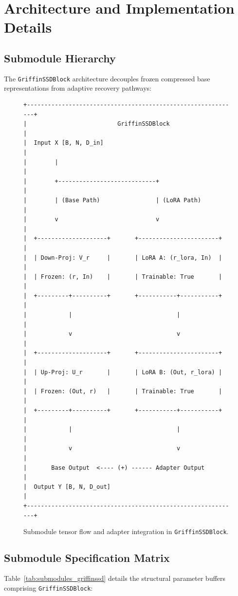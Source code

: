 \section{Architecture and Implementation Details}

\subsection{Submodule Hierarchy}
The \texttt{GriffinSSDBlock} architecture decouples frozen compressed base representations from adaptive recovery pathways:

\begin{figure}[H]
\centering
\begin{verbatim}
+-------------------------------------------------------------+
|                          GriffinSSDBlock                    |
|  Input X [B, N, D_in]                                       |
|        |                                                    |
|        +----------------------------+                       |
|        | (Base Path)                | (LoRA Path)           |
|        v                            v                       |
|  +--------------------+       +-----------------------+     |
|  | Down-Proj: V_r     |       | LoRA A: (r_lora, In)  |     |
|  | Frozen: (r, In)    |       | Trainable: True       |     |
|  +---------+----------+       +-----------+-----------+     |
|            |                              |                 |
|            v                              v                 |
|  +--------------------+       +-----------------------+     |
|  | Up-Proj: U_r       |       | LoRA B: (Out, r_lora) |     |
|  | Frozen: (Out, r)   |       | Trainable: True       |     |
|  +---------+----------+       +-----------+-----------+     |
|            |                              |                 |
|            v                              v                 |
|       Base Output  <---- (+) ------ Adapter Output          |
|  Output Y [B, N, D_out]                                     |
+-------------------------------------------------------------+
\end{verbatim}
\caption{Submodule tensor flow and adapter integration in \texttt{GriffinSSDBlock}.}
\end{figure}

\subsection{Submodule Specification Matrix}
Table~\ref{tab:submodules_griffinssd} details the structural parameter buffers comprising \texttt{GriffinSSDBlock}:

